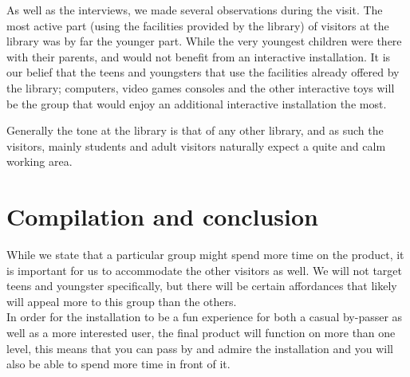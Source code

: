 As well as the interviews, we made several observations during the visit. The most active part (using the facilities provided by the library) of visitors at the library was by far the younger part. While the very youngest children were there with their parents, and would not benefit from an interactive installation. It is our belief that the teens and youngsters that use the facilities already offered by the library; computers, video games consoles and the other interactive toys  will be the group that would enjoy an additional interactive installation the most.

Generally the tone at the library is that of any other library, and as such the visitors, mainly students and adult visitors naturally expect a quite and calm working area.

\section{Compilation and conclusion}

While we state that a particular group might spend more time on the product, it is important for us to accommodate the other visitors as well. We will not target teens and youngster specifically, but there will be certain affordances that likely will appeal more to this group than the others.
\\
In order for the installation to be a fun experience for both a casual by-passer as well as a more interested user, the final product will function on more than one level, this means that you can pass by and admire the installation and you will also be able to spend more time in front of it.